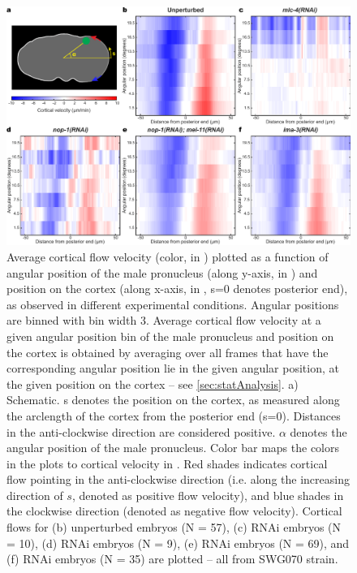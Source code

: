 \begin{figure}
\centering
\includegraphics[width=\textwidth]{Results/FigExpCorticalFlows/crtxFlowAngle.pdf}
\caption[Comparing cortical flows between different experimental conditions vs angular positions]{Average cortical flow velocity (color, in \si{\unitCrtxVel}) plotted as a function of angular position of the male pronucleus (along y-axis, in \si{\unitAngle}) and position on the cortex (along x-axis, in \si{\unitLength}, s=\SI{0}{\unitLength} denotes posterior end), as observed in different experimental conditions. Angular positions are binned with bin width \SI{3}{\unitAngle}. Average cortical flow velocity at a given angular position bin of the male pronucleus and position on the cortex is obtained by averaging over all frames that have the corresponding angular position lie in the given angular position, at the given position on the cortex -- see \autoref{sec:statAnalysis}. a) Schematic. s denotes the position on the cortex, as measured along the arclength of the cortex from the posterior end (s=\SI{0}{\unitLength}). Distances in the anti-clockwise direction are considered positive. $\alpha$ denotes the angular position of the male pronucleus. Color bar maps the colors in the plots to cortical velocity in \si{\unitCrtxVel}. Red shades indicates cortical flow pointing in the anti-clockwise direction (i.e. along the increasing direction of $s$, denoted as positive flow velocity), and blue shades in the clockwise direction (denoted as negative flow velocity). Cortical flows for (b) unperturbed embryos (N = 57), (c)  RNAi embryos  (N = 10), (d)  RNAi embryos  (N = 9), (e)  RNAi embryos  (N = 69), and (f)  RNAi embryos (N = 35) are plotted -- all from SWG070 strain.}
\label{fig:resultsCorticalAvgFlowVsAngle}
\end{figure}

